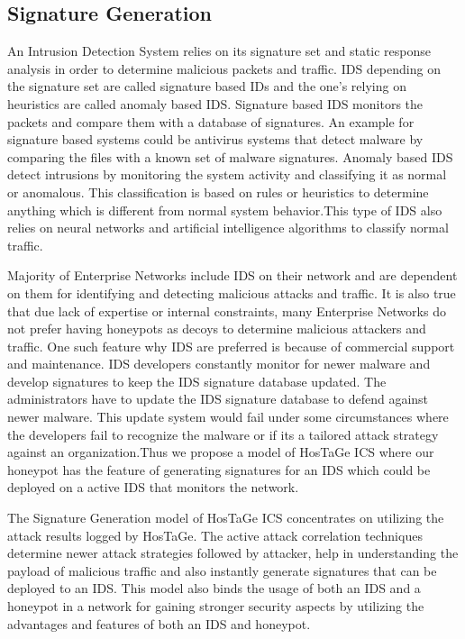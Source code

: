 \documentclass[article,msc=informatik,type=msc,colorback,accentcolor=tud9c]{tudthesis}
\begin{document}
  
  \vspace{5mm} 
  \subsection{Signature Generation}\label{Signature Generations}
  An Intrusion Detection System relies on its signature set and static response analysis in order to determine malicious packets and traffic. IDS depending on the signature set are called signature based IDs and the one's relying on heuristics are called anomaly based IDS.
  Signature based \ac{IDS} monitors the packets and compare them with a database of signatures. An example for signature based systems could be antivirus systems that detect malware by comparing the files with a known set of malware signatures. Anomaly based \ac{IDS} detect intrusions by monitoring the system activity and classifying it as normal or anomalous. This classification is based on rules or heuristics to determine anything which is different from normal system behavior.This type of IDS also relies on neural networks and artificial intelligence algorithms to classify normal traffic. 
  
  
  \vspace{3mm}
  Majority of Enterprise Networks include \ac{IDS} on their network and are dependent on them for identifying and detecting malicious attacks and traffic. It is also true that due lack of expertise or internal constraints, many Enterprise Networks do not prefer having honeypots as decoys to determine malicious attackers and traffic. One such feature why \ac{IDS} are preferred is because of commercial support and maintenance. \ac{IDS} developers constantly monitor for newer malware and develop signatures to keep the \ac{IDS} signature database updated. The administrators have to update the \ac{IDS} signature database to defend against newer malware. This update system would fail under some circumstances where the developers fail to recognize the malware or if its a tailored attack strategy against an organization.Thus we propose a model of HosTaGe ICS where our honeypot has the feature of generating signatures for an IDS which could be deployed on a active IDS that monitors the network.  
  
 \vspace{3mm}
  The Signature Generation model of HosTaGe ICS concentrates on utilizing the attack results logged by HosTaGe. The active attack correlation techniques determine newer attack strategies followed by attacker, help in understanding the payload of malicious traffic and also instantly generate signatures that can be deployed to an IDS. This model also binds the usage of both an \ac{IDS} and a honeypot in a network for gaining stronger security aspects by utilizing the advantages and features of both an IDS and honeypot.
  
\end{document}
